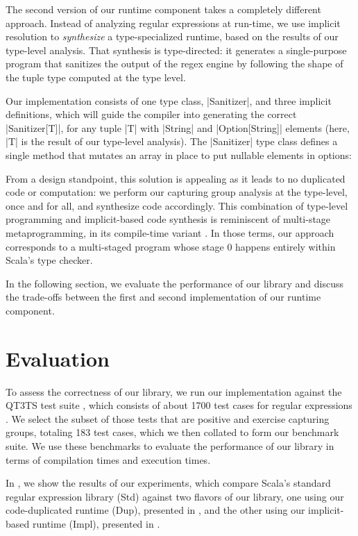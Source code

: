 The second version of our runtime component takes a completely different approach.
Instead of analyzing regular expressions at run-time, we use implicit resolution to \emph{synthesize} a type-specialized runtime, based on the results of our type-level analysis.
That synthesis is type-directed: it generates a single-purpose program that sanitizes the output of the regex engine by following the shape of the tuple type computed at the type level.

Our implementation consists of one type class, |Sanitizer|, and three implicit definitions, which will guide the compiler into generating the correct |Sanitizer[T]|, for any tuple |T| with |String| and |Option[String]| elements (here, |T| is the result of our type-level analysis).
The |Sanitizer| type class defines a single method that mutates an array in place to put nullable elements in options:

\regexSanitizerTypeClass

From a design standpoint, this solution is appealing as it leads to no duplicated code or computation: we perform our capturing group analysis at the type-level, once and for all, and synthesize code accordingly.
This combination of type-level programming and implicit-based code synthesis is reminiscent of multi-stage metaprogramming, in its com\-pile-time variant \citep{stucki2018practical}.
In those terms, our approach corresponds to a multi-staged program whose stage 0 happens entirely within Scala's type checker.

In the following section, we evaluate the performance of our library and discuss the trade-offs between the first and second implementation of our runtime component.

\section{Evaluation}
\label{sec:evaluation}

To assess the correctness of our library, we run our implementation against the QT3TS test suite \citep{w3c1994xquery}, which consists of about 1700 test cases for regular expressions \citep{w3c1994qt3ts}.
We select the subset of those tests that are positive and exercise capturing groups, totaling 183 test cases, which we then collated to form our benchmark suite.
We use these benchmarks to evaluate the performance of our library in terms of compilation times and execution times.

In , we show the results of our experiments, which compare Scala's standard regular expression library (Std) against two flavors of our library, one using our code-dupli\-cated runtime (Dup), presented in , and the other using our implicit-based runtime (Impl), presented in .

